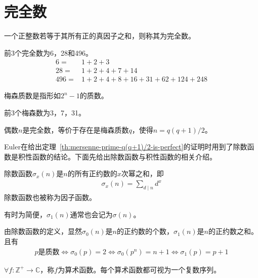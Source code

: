 \section{完全数}
\label{sec:perfect-number}

\begin{definition}
  一个正整数若等于其所有正的真因子之和，则称其为完全数。
\end{definition}
前3个完全数为6，28和496。
\begin{align*}
  6   ={} & 1 + 2 + 3\\
  28  ={} & 1 + 2 + 4 + 7 + 14\\
  496 ={} & 1 + 2 + 4 + 8 + 16 + 31 + 62 + 124 + 248
\end{align*}

\begin{definition}
  梅森质数是指形如$2^n - 1$的质数。
\end{definition}

前3个梅森数为3，7，31。

\begin{theorem}\label{th:mersenne-prime-q(q+1)/2-is-perfect}
  偶数$n$是完全数，等价于存在是梅森质数$q$，使得$n=q(q+1)/2$。
\end{theorem}

Euler在给出定理~\ref{th:mersenne-prime-q(q+1)/2-is-perfect}的证明时用到了除数函数是积性函数的结论。下面先给出除数函数与积性函数的相关介绍。

\begin{definition}
  除数函数$\sigma_x(n)$是$n$的所有正约数的$x$次幂之和，即
  \begin{align*}
    \sigma_x(n)=\sum_{d\mid n} d^x
  \end{align*}
  除数函数也被称为因子函数。
\end{definition}
有时为简便，$\sigma_1(n)$通常也会记为$\sigma(n)$。

由除数函数的定义，显然$\sigma_0(n)$是$n$的正约数的个数，$\sigma_1(n)$是$n$的正约数之和。且有
\begin{align*}
  p\text{是质数} \iff \sigma_0(p) = 2 \iff \sigma_0(p^n) = n + 1 \iff \sigma_1(p) = p + 1
\end{align*}

\begin{definition}
  $\forall f:\mathbb{Z^+}\to\mathbb{C}$，称$f$为算术函数。每个算术函数都可视为一个复数序列。
\end{definition}

